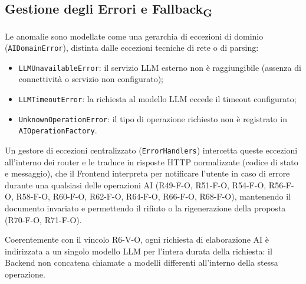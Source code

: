 \subsection{Gestione degli Errori e Fallback\textsubscript{G}}
\label{sec:gestione-errori}
Le anomalie sono modellate come una gerarchia di eccezioni di dominio (\texttt{AIDomainError}), distinta dalle eccezioni tecniche di rete o di parsing:
\begin{itemize}
	\item \texttt{LLMUnavailableError}: il servizio LLM esterno non è raggiungibile (assenza di connettività o servizio non configurato);
	\item \texttt{LLMTimeoutError}: la richiesta al modello LLM eccede il timeout configurato;
	\item \texttt{UnknownOperationError}: il tipo di operazione richiesto non è registrato in \texttt{AIOperationFactory}.
\end{itemize}
Un gestore di eccezioni centralizzato (\texttt{ErrorHandlers}) intercetta queste eccezioni all'interno dei router e le traduce in risposte HTTP normalizzate (codice di stato e messaggio), che il Frontend interpreta per notificare l'utente in caso di errore durante una qualsiasi delle operazioni AI (R49-F-O, R51-F-O, R54-F-O, R56-F-O, R58-F-O, R60-F-O, R62-F-O, R64-F-O, R66-F-O, R68-F-O), mantenendo il documento invariato e permettendo il rifiuto o la rigenerazione della proposta (R70-F-O, R71-F-O). 

Coerentemente con il vincolo R6-V-O, ogni richiesta di elaborazione AI è indirizzata a un singolo modello LLM per l'intera durata della richiesta: il Backend non concatena chiamate a modelli differenti all'interno della stessa operazione.

\FloatBarrier
